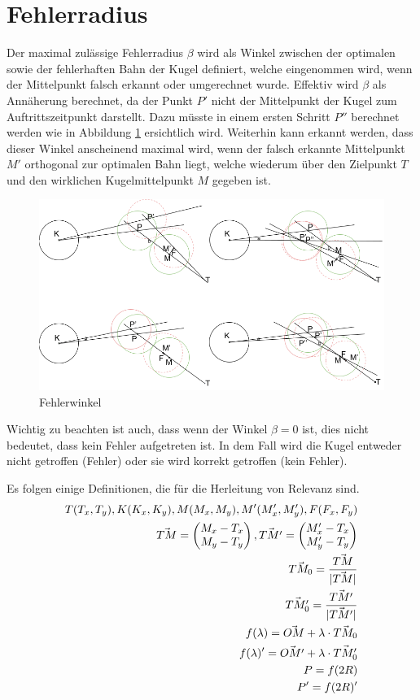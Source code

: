 \section{Fehlerradius}\label{anhang:fehler}
Der maximal zulässige Fehlerradius $\beta$ wird als Winkel zwischen der optimalen sowie der fehlerhaften Bahn
der Kugel definiert, welche eingenommen wird, wenn der Mittelpunkt falsch erkannt oder umgerechnet wurde. Effektiv
wird $\beta$ als Annäherung berechnet, da der Punkt $P'$ nicht der Mittelpunkt der Kugel zum Auftrittszeitpunkt
darstellt. Dazu müsste in einem ersten Schritt $P''$ berechnet werden wie in Abbildung \ref{fig:fehlerwinkel} ersichtlich
wird. Weiterhin kann erkannt werden, dass dieser Winkel anscheinend maximal wird, wenn der falsch erkannte Mittelpunkt
$M'$ orthogonal zur optimalen Bahn liegt, welche wiederum über den Zielpunkt $T$ und den wirklichen Kugelmittelpunkt $M$ gegeben ist.

\begin{figure}[h!]
    \begin{center}
        \includegraphics[width=0.7\linewidth]{../common/07_appendix/resources/02_fehlerwinkel.png}
    \end{center}
    \caption{Fehlerwinkel}
    \label{fig:fehlerwinkel}
\end{figure}
Wichtig zu beachten ist auch, dass wenn der Winkel $\beta = 0$ ist, dies nicht bedeutet,
dass kein Fehler aufgetreten ist. In dem Fall wird die Kugel entweder nicht getroffen (Fehler) oder sie wird korrekt
getroffen (kein Fehler).

Es folgen einige Definitionen, die für die Herleitung von Relevanz sind.
\begin{align}
    T(T_x, T_y), K(K_x, K_y), M(M_x, M_y), M'(M_x', M_y'), F(F_x, F_y)\\
    \vec{TM} = \begin{pmatrix}M_x - T_x\\M_y - T_y\end{pmatrix}, \vec{TM'} = \begin{pmatrix}M_x' - T_x\\M_y' - T_y\end{pmatrix}\\
    \vec{TM_0} = \frac{\vec{TM}}{\lvert \vec{TM} \rvert}\\
    \vec{TM_0'} = \frac{\vec{TM'}}{\lvert \vec{TM'} \rvert}\\
    f(\lambda) = \vec{OM} + \lambda \cdot \vec{TM_0}\\
    f(\lambda)' = \vec{OM'} + \lambda \cdot \vec{TM_0'}\\
    P = f(2R)\\
    P' = f(2R)'
\end{align}

